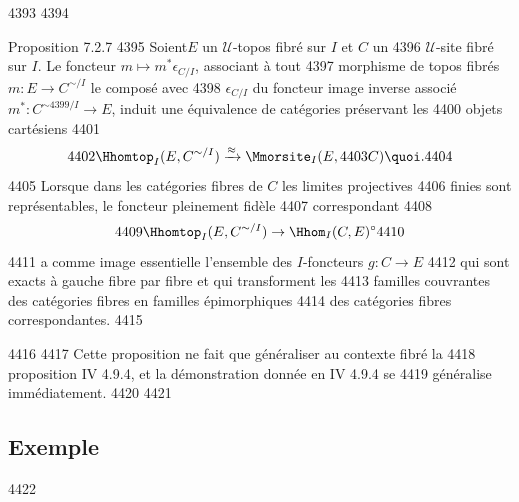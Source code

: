   4393	
  4394	\begin{enonce*}{Proposition 7.2.7}
  4395	Soient\pageoriginale $E$ un $𝒰$-topos fibré sur $I$ et $C$ un
  4396	$𝒰$-site fibré sur $I$. Le foncteur $m \mapsto m^{\ast} \epsilon_{C/I}$, associant à tout
  4397	morphisme de topos fibrés $m : E \to C^{\sim /I}$ le composé avec
  4398	$\epsilon_{C/I}$ du foncteur image inverse associé $m^{\ast} : C^{\sim
  4399	/ I} \to E$, induit une équivalence de catégories préservant les
  4400	objets cartésiens
  4401	$$
  4402	\Hhomtop_I (E, C^{\sim / I}) \xrightarrow{\approx} \Mmorsite_I(E,
  4403	C){\quoi}.
  4404	$$
  4405	Lorsque dans les catégories fibres de $C$ les limites projectives
  4406	finies sont représentables, le foncteur pleinement fidèle
  4407	correspondant
  4408	$$
  4409	\Hhomtop_{I} (E, C^{\sim/ I}) \to \Hhom_{I} (C, E)^{\circ}
  4410	$$
  4411	a comme image essentielle l'ensemble des $I$-foncteurs $g : C \to E$
  4412	qui sont exacts à gauche fibre par fibre et qui transforment les
  4413	familles couvrantes des catégories fibres en familles épimorphiques
  4414	des catégories fibres correspondantes.
  4415	\end{enonce*}
  4416	
  4417	Cette proposition ne fait que généraliser au contexte fibré la
  4418	proposition IV 4.9.4, et la démonstration donnée en IV 4.9.4 se
  4419	généralise immédiatement.
  4420	
  4421	\subsection{Exemple}
  4422	
